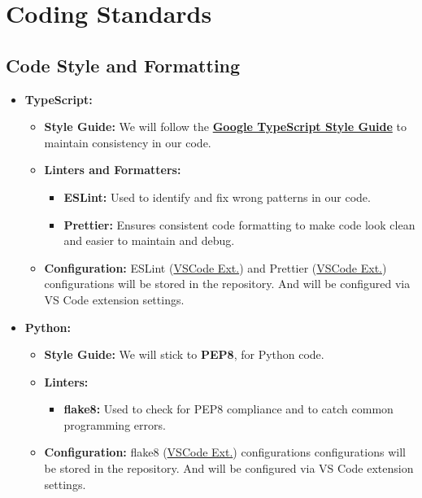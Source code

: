\documentclass{article}
\begin{document}
\section{Coding Standards}

\subsection{Code Style and Formatting}

\begin{itemize}
    \item \textbf{TypeScript:}
    \begin{itemize}
        \item \textbf{Style Guide:} We will follow the \textbf{\href{https://google.github.io/styleguide/tsguide.html}{Google TypeScript Style Guide}} to maintain consistency in our code.
        \item \textbf{Linters and Formatters:}
        \begin{itemize}
            \item \textbf{ESLint:} Used to identify and fix wrong patterns in our code.
            \item \textbf{Prettier:} Ensures consistent code formatting to make code look clean and easier to maintain and debug.
        \end{itemize}
        \item \textbf{Configuration:} ESLint (\href{https://marketplace.visualstudio.com/items?itemName=dbaeumer.vscode-eslint}{VSCode Ext.}) and Prettier (\href{https://marketplace.visualstudio.com/items?itemName=esbenp.prettier-vscode}{VSCode Ext.}) configurations will be stored in the repository. And will be configured via VS Code extension settings.
    \end{itemize}
    
    \item \textbf{Python:}
    \begin{itemize}
        \item \textbf{Style Guide:} We will stick to \textbf{PEP8}, for Python code.
        \item \textbf{Linters:}
        \begin{itemize}
            \item \textbf{flake8:} Used to check for PEP8 compliance and to catch common programming errors.
        \end{itemize}
        \item \textbf{Configuration:} flake8 (\href{https://marketplace.visualstudio.com/items?itemName=ms-python.flake8}{VSCode Ext.}) configurations configurations will be stored in the repository. And will be configured via VS Code extension settings. 
    \end{itemize}
\end{itemize}
\end{document}

